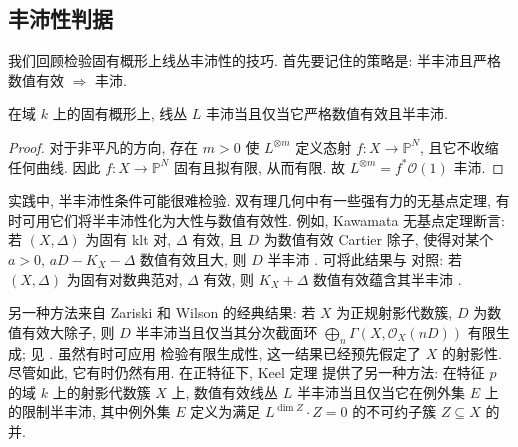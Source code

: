 \subsection{丰沛性判据}\label{src:B.2.3-subsection}
我们回顾检验固有概形上线丛丰沛性的技巧. 首先要记住的策略是: 半丰沛且严格数值有效 $\Rightarrow$ 丰沛.
\begin{lemma}\label{src:B.2.26}
在域 $k$ 上的固有概形上, 线丛 $L$ 丰沛当且仅当它严格数值有效且半丰沛.
\end{lemma}
\begin{proof}
对于非平凡的方向, 存在 $m>0$ 使 $L^{\otimes m}$ 定义态射 $f:X\to\mathbb P^N$, 且它不收缩任何曲线. 因此 $f:X\to\mathbb P^N$ 固有且拟有限, 从而有限. 故 $L^{\otimes m}=f^*\mathcal O(1)$ 丰沛.
\end{proof}
\begin{remark}\label{src:B.2.27}
实践中, 半丰沛性条件可能很难检验. 双有理几何中有一些强有力的无基点定理, 有时可用它们将半丰沛性化为大性与数值有效性. 例如, Kawamata 无基点定理断言: 若 $(X,\Delta)$ 为固有 klt 对, $\Delta$ 有效, 且 $D$ 为数值有效 Cartier 除子, 使得对某个 $a>0$, $aD-K_X-\Delta$ 数值有效且大, 则 $D$ 半丰沛 \cite[定理 $3.3$]{KM98}. 可将此结果与 对照: 若 $(X,\Delta)$ 为固有对数典范对, $\Delta$ 有效, 则 $K_X+\Delta$ 数值有效蕴含其半丰沛 \cite[猜想 $3.12$]{KM98}.

另一种方法来自 Zariski 和 Wilson 的经典结果: 若 $X$ 为正规射影代数簇, $D$ 为数值有效大除子, 则 $D$ 半丰沛当且仅当其分次截面环 $\bigoplus_n\Gamma(X,\mathcal O_X(nD))$ 有限生成; 见 \cite[定理 $2.3.15$]{Laz04a}. 虽然有时可应用 \cite{BCHM10} 检验有限生成性, 这一结果已经预先假定了 $X$ 的射影性. 尽管如此, 它有时仍然有用. 在正特征下, Keel 定理 \cite{Kee99} 提供了另一种方法: 在特征 $p$ 的域 $k$ 上的射影代数簇 $X$ 上, 数值有效线丛 $L$ 半丰沛当且仅当它在例外集 $E$ 上的限制半丰沛, 其中例外集 $E$ 定义为满足 $L^{\dim Z}\cdot Z=0$ 的不可约子簇 $Z\subseteq X$ 的并.
\end{remark}

